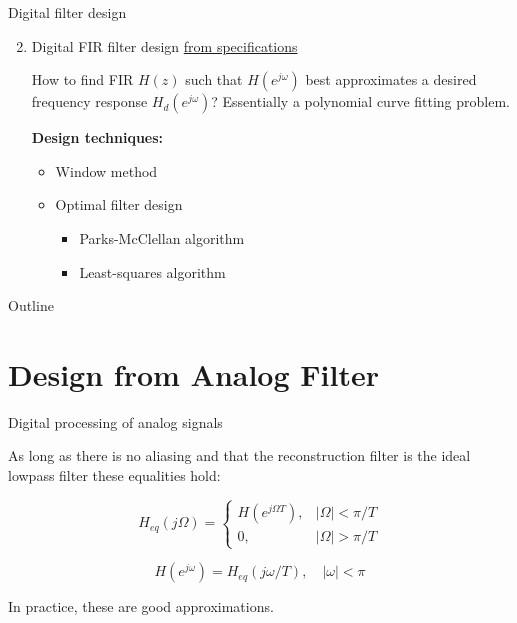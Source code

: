 \documentclass[10pt]{beamer}
\begin{document}
%
\begin{frame}{Digital filter design}
\begin{enumerate}\setcounter{enumi}{1}
	\item Digital FIR filter design \underline{from specifications}
	
	How to find FIR $H(z)$ such that $H(e^{j\omega})$ best approximates a desired frequency response $H_d(e^{j\omega})$? Essentially a polynomial curve fitting problem.
	\begin{center}
		\resizebox{0.6\linewidth}{!}{}
	\end{center}
	
	\textbf{Design techniques:}
	\begin{itemize}
		\item Window method
		\item Optimal filter design
		\begin{itemize}
			\item Parks-McClellan algorithm
			\item Least-squares algorithm
		\end{itemize}
	\end{itemize}
\end{enumerate}
\end{frame}

%
\begin{frame}{Outline}
	\tableofcontents
\end{frame}

\section{Design from Analog Filter}
\begin{frame}{Digital processing of analog signals}
\begin{center}
	\def\Heff{1}
	\resizebox{\linewidth}{!}{}
\end{center}

As long as there is no aliasing and that the reconstruction filter is the ideal lowpass filter these equalities hold:

\begin{equation}
H_{eq}(j\Omega) = \begin{cases}
H(e^{j\Omega T}), & |\Omega| < \pi/T \\
0, & |\Omega| > \pi/T
\end{cases} \tag{from DSP to analog}
\end{equation}

\begin{equation}
H(e^{j\omega}) = H_{eq}(j\omega/T), \quad|\omega| < \pi  \tag{from analog to DSP}
\end{equation}

In practice, these are good approximations.
\end{frame}
\end{document}
